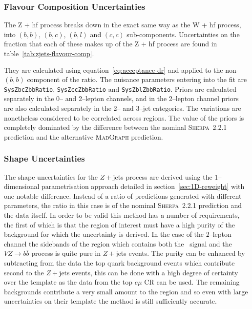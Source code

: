 \subsubsection{Flavour Composition Uncertainties}

The Z + hf process breaks down in the exact same way as the W + hf process, into
$(b,b)$, $(b, c)$, $(b, l)$ and $(c, c)$ sub-components. Uncertainties on the
fraction that each of these makes up of the Z + hf process are found in
table~\ref{tab:zjets-flavour-comp}.

They are calculated using equation~\ref{eq:acceptance-dr} and applied to the
non-$(b, b)$ component of the ratio. The nuisance parameters entering into the
fit are \texttt{SysZbcZbbRatio}, \texttt{SysZccZbbRatio} and
\texttt{SysZblZbbRatio}. Priors are calculated separately in the 0-- and
2--lepton channels, and in the 2--lepton channel priors are also calculated
separately in the 2-- and 3--jet categories. The variations are nonetheless
considered to be correlated across regions. The value of the priors is
completely dominated by the difference between the nominal \textsc{Sherpa}~2.2.1
prediction and the alternative \textsc{MadGraph} prediction.

\subsubsection{Shape Uncertainties}
\label{sec:zjets-shapes}

The shape uncertainties for the $Z+$jets process are derived using the
1--dimensional parametrisation approach detailed in
section~\ref{sec:1D-reweight} with one notable difference. Instead of a ratio of
predictions generated with different parameters, the ratio in this case is of
the nominal \textsc{Sherpa}~2.2.1 prediction and the data itself. In order to be
valid this method has a number of requirements, the first of which is that the
region of interest must have a high purity of the background for which the
uncertainty is derived. In the case of the 2--lepton channel the sidebands of
the region which contains both the \VHbb\ signal and the $V\!Z\! \to\! b\bar{b}$
process is quite pure in $Z+$jets events. The purity can be enhanced by
subtracting from the data the top quark background events which contribute
second to the $Z+$jets events, this can be done with a high degree of
certainty over the template as the data from the top $e\mu$ CR can be used. The
remaining backgrounds contribute a very small amount to the region and so even
with large uncertainties on their template the method is still sufficiently
accurate.

